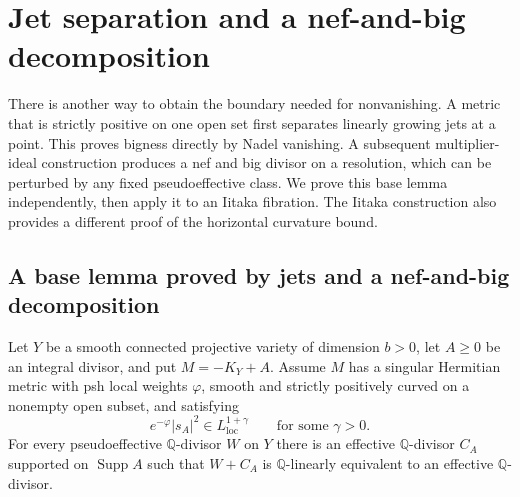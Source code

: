 \section{Jet separation and a nef-and-big decomposition}
\label{jet:iitaka-section}

There is another way to obtain the boundary needed for nonvanishing.
A metric that is strictly positive on one open set first separates
linearly growing jets at a point.  This proves bigness directly by Nadel
vanishing.  A subsequent multiplier-ideal construction produces a nef
and big divisor on a resolution, which can be perturbed by any fixed
pseudoeffective class.  We prove this base lemma independently, then
apply it to an Iitaka fibration.  The Iitaka construction also provides
a different proof of the horizontal curvature bound.

\subsection{A base lemma proved by jets and a nef-and-big decomposition}

\begin{theorem}\label{jet:base-lemma}
Let $Y$ be a smooth connected projective variety of dimension $b>0$,
let $A\geq0$ be an integral divisor, and put $M=-K_Y+A$.
Assume $M$ has a singular Hermitian metric with psh local weights
$\varphi$, smooth and strictly positively curved on a nonempty open
subset, and satisfying
\begin{equation}\label{jet:weighted-assumption}
 e^{-\varphi}|s_A|^2\in L^{1+\gamma}_{\mathrm{loc}}
 \qquad\text{for some }\gamma>0.
\end{equation}
For every pseudoeffective $\mathbb Q$-divisor $W$ on $Y$ there is an
effective $\mathbb Q$-divisor $C_A$ supported on $\operatorname{Supp}A$
such that $W+C_A$ is $\mathbb Q$-linearly equivalent to an effective
$\mathbb Q$-divisor.
\end{theorem}

